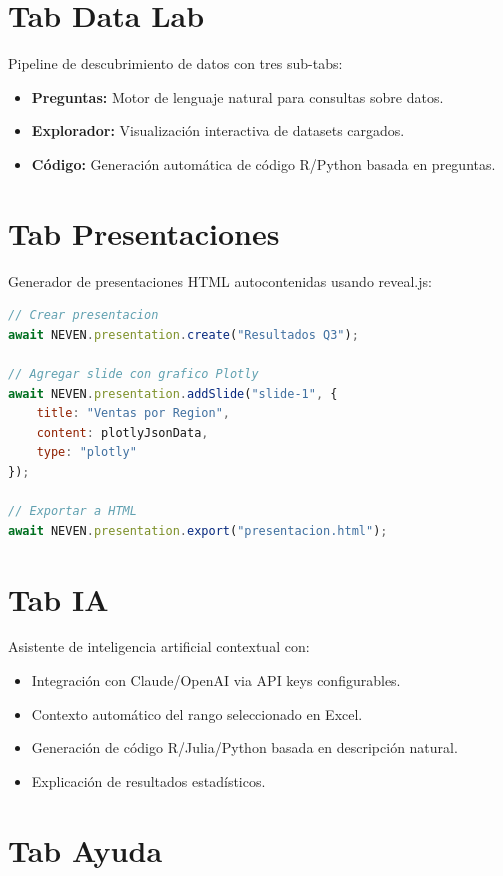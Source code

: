 \documentclass[12pt, a4paper]{report}
\begin{document}
\section{Tab Data Lab}

Pipeline de descubrimiento de datos con tres sub-tabs:
\begin{itemize}
    \item \textbf{Preguntas:} Motor de lenguaje natural para consultas sobre datos.
    \item \textbf{Explorador:} Visualización interactiva de datasets cargados.
    \item \textbf{Código:} Generación automática de código R/Python basada en preguntas.
\end{itemize}

\section{Tab Presentaciones}

Generador de presentaciones HTML autocontenidas usando reveal.js:

\begin{lstlisting}[language=javascript, caption={API de presentaciones desde Studio}]
// Crear presentacion
await NEVEN.presentation.create("Resultados Q3");

// Agregar slide con grafico Plotly
await NEVEN.presentation.addSlide("slide-1", {
    title: "Ventas por Region",
    content: plotlyJsonData,
    type: "plotly"
});

// Exportar a HTML
await NEVEN.presentation.export("presentacion.html");
\end{lstlisting}

\section{Tab IA}

Asistente de inteligencia artificial contextual con:
\begin{itemize}
    \item Integración con Claude/OpenAI via API keys configurables.
    \item Contexto automático del rango seleccionado en Excel.
    \item Generación de código R/Julia/Python basada en descripción natural.
    \item Explicación de resultados estadísticos.
\end{itemize}

\section{Tab Ayuda}
\end{document}
